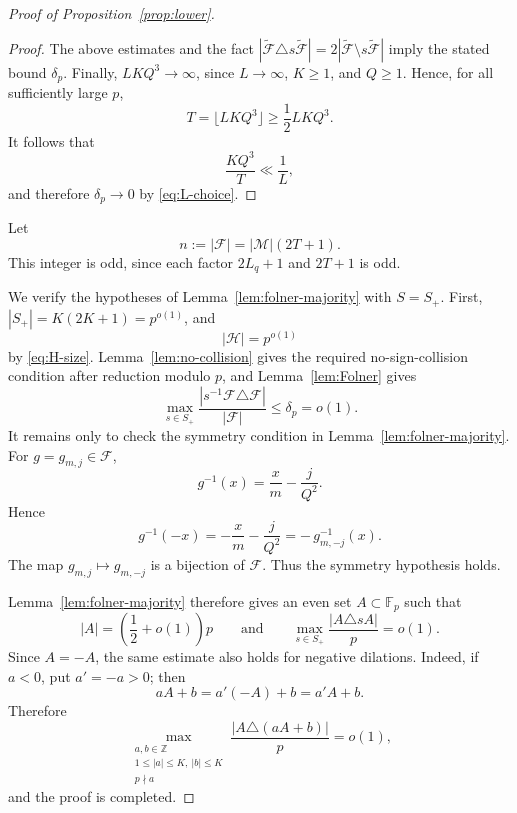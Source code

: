\documentclass[11pt,letterpaper,reqno]{amsart}
\theoremstyle{definition}
\newcommand{\F}{\mathbb F}
\newcommand{\Z}{\mathbb Z}
\newcommand{\1}{\mathbf 1}
\begin{document}
\begin{proof}[Proof of Proposition~\ref{prop:lower}]
\begin{proof}
The above estimates and the fact
$|\widetilde{\mathcal F}\triangle s\widetilde{\mathcal F}|
=2|\widetilde{\mathcal F}\setminus s\widetilde{\mathcal F}|$ imply the stated
bound $\delta_p$. Finally, \(LKQ^3\to\infty\), since \(L\to\infty\), \(K\ge1\), and \(Q\ge1\).
Hence, for all sufficiently large \(p\),
\[
        T=\lfloor LKQ^3\rfloor\ge \frac12 LKQ^3 .
\]
It follows that
\[
        \frac{KQ^3}{T}\ll \frac1L,
\]
and therefore \(\delta_p\to0\) by \eqref{eq:L-choice}.
\end{proof}

Let
\[
        n:=|\mathcal F|=|\mathcal M|(2T+1).
\]
This integer is odd, since each factor $2L_q+1$ and $2T+1$ is odd.

We verify the hypotheses of Lemma~\ref{lem:folner-majority} with
$S=S_+$.  First, $|S_+|=K(2K+1)=p^{o(1)}$, and
\[
        |\mathcal H|=p^{o(1)}
\]
by \eqref{eq:H-size}.  Lemma~\ref{lem:no-collision} gives the required
no-sign-collision condition after reduction modulo $p$, and
Lemma~\ref{lem:Folner} gives
\[
        \max_{s\in S_+}
        \frac{|s^{-1}\mathcal F\triangle\mathcal F|}{|\mathcal F|}
        \le \delta_p=o(1).
\]
It remains only to check the symmetry condition in
Lemma~\ref{lem:folner-majority}.  For $g=g_{m,j}\in\mathcal F$,
\[
        g^{-1}(x)=\frac{x}{m}-\frac{j}{Q^2}.
\]
Hence
\[
        g^{-1}(-x)=-\frac{x}{m}-\frac{j}{Q^2}
        =-\,g_{m,-j}^{-1}(x).
\]
The map $g_{m,j}\mapsto g_{m,-j}$ is a bijection of $\mathcal F$.  Thus the
symmetry hypothesis holds.

Lemma~\ref{lem:folner-majority} therefore gives an even set $A\subset\F_p$ such
that
\[
        |A|=\left(\frac12+o(1)\right)p \qquad \text{and} \qquad \max_{s\in S_+}\frac{|A\triangle sA|}{p}=o(1).
\]
Since $A=-A$, the same estimate also holds for negative dilations.  Indeed, if
$a<0$, put $a'=-a>0$; then
\[
        aA+b=a'(-A)+b=a'A+b.
\]
Therefore
\[
        \max_{\substack{a,b\in\Z\\ 1\le |a|\le K,\ |b|\le K\\ p\nmid a}}
        \frac{|A\triangle(aA+b)|}{p}=o(1),
\]
and the proof is completed. 
\end{proof}
\end{document}
